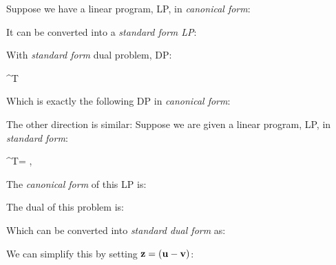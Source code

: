 Suppose we have a linear program, LP, in \textit{canonical form}:
It can be converted into a \textit{standard form LP}: 
With \textit{standard form} dual problem, DP: 
\begin{frml}
	\max \vb^T\vy \st {}\vy \leq \mat{\vc \\ \vzero} \\
\end{frml}
Which is exactly the following DP in \textit{canonical form}:

The other direction is similar: 
Suppose we are given a linear program, LP, in \textit{standard form}:
\begin{frml}
	\min \vc^T\vx \st \vA\vx = \vb, \; \vx \geq \vzero
\end{frml}
The \textit{canonical form} of this LP is:
The dual of this problem is:
Which can be converted into \textit{standard dual form} as:
We can simplify this by setting $\mathbf{z} = (\mathbf{u} - \mathbf{v})$:

